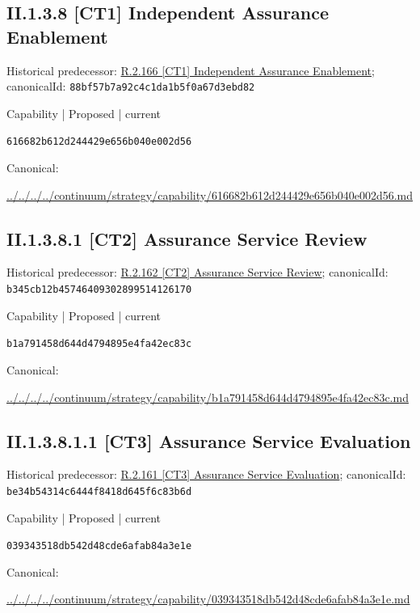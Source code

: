 \documentclass[10pt,a4paper]{article}
\begin{document}
\subsection*{II.1.3.8 [CT1] Independent Assurance Enablement}
Historical predecessor: \hyperref[element-88bf57b7a92c4c1da1b5f0a67d3ebd82]{R.2.166 [CT1] Independent Assurance Enablement}; canonicalId: \texttt{88bf57b7a92c4c1da1b5f0a67d3ebd82}\par
\label{element-616682b612d244429e656b040e002d56}
{\small Capability | Proposed | current}\par
\texttt{616682b612d244429e656b040e002d56}\par
Canonical: \par
{\footnotesize\url{../../../../continuum/strategy/capability/616682b612d244429e656b040e002d56.md}}\par
\subsection*{II.1.3.8.1 [CT2] Assurance Service Review}
Historical predecessor: \hyperref[element-b345cb12b45746409302899514126170]{R.2.162 [CT2] Assurance Service Review}; canonicalId: \texttt{b345cb12b45746409302899514126170}\par
\label{element-b1a791458d644d4794895e4fa42ec83c}
{\small Capability | Proposed | current}\par
\texttt{b1a791458d644d4794895e4fa42ec83c}\par
Canonical: \par
{\footnotesize\url{../../../../continuum/strategy/capability/b1a791458d644d4794895e4fa42ec83c.md}}\par
\subsection*{II.1.3.8.1.1 [CT3] Assurance Service Evaluation}
Historical predecessor: \hyperref[element-be34b54314c6444f8418d645f6c83b6d]{R.2.161 [CT3] Assurance Service Evaluation}; canonicalId: \texttt{be34b54314c6444f8418d645f6c83b6d}\par
\label{element-039343518db542d48cde6afab84a3e1e}
{\small Capability | Proposed | current}\par
\texttt{039343518db542d48cde6afab84a3e1e}\par
Canonical: \par
{\footnotesize\url{../../../../continuum/strategy/capability/039343518db542d48cde6afab84a3e1e.md}}\par
\end{document}
